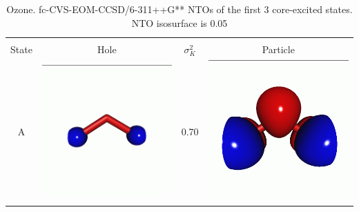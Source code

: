 \documentclass[journal=jctcce,manuscript=article]{achemso}
\begin{document}
\begin{table}[H]
\centering
\caption{Ozone. fc-CVS-EOM-CCSD/6-311++G**   NTOs of the first 3 core-excited states. NTO isosurface is 0.05\label{fgr:Ozone-ntos}}
\vspace{3em}
\begin{tabular}{ c | c c c }
    \hline
            & \multicolumn{3}{c}{} \\
    State &  Hole & $\sigma_K^2$ & Particle \\
    \hline
    A &  
    \begin{minipage}{0.2\textwidth}
        \centering
        \includegraphics[scale=0.10]{NTO/O3/1h.png}
    \end{minipage}
    &
    0.70
    &  \begin{minipage}{0.2\textwidth}
        \centering
        \includegraphics[scale=0.10]{NTO/O3/1p.png}

\end{minipage}
\end{tabular}
\end{table}
\end{document}
